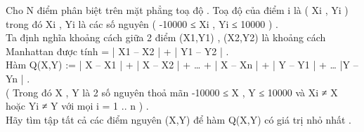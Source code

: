 Cho N điểm phân biệt trên mặt phẳng toạ độ . Toạ độ của điểm i là ( Xi , Yi ) trong đó Xi , Yi là các số nguyên ( -10000 ≤ Xi , Yi ≤ 10000 ) .   
\\   Ta định nghĩa khoảng cách giữa 2 điểm (X1,Y1) , (X2,Y2) là khoảng cách Manhattan được tính = | X1 – X2 | + | Y1 – Y2 | .   
\\   Hàm Q(X,Y) := | X – X1 | + | X – X2 | + … + | X – Xn | + | Y – Y1 | + … |Y – Yn | .   
\\   ( Trong đó X , Y là 2 số nguyên thoả mãn -10000 ≤ X , Y ≤ 10000 và Xi ≠ X hoặc Yi ≠ Y với mọi i = 1 .. n  ) .   
\\   Hãy tìm tập tất cả các điểm nguyên (X,Y) để hàm Q(X,Y) có giá trị nhỏ nhất .  

\